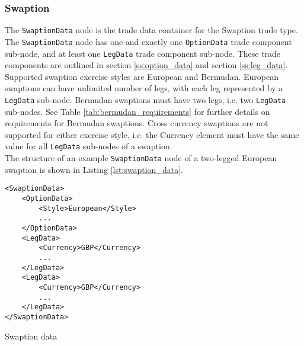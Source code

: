 \subsubsection{Swaption}

The \lstinline!SwaptionData!  node is the trade data container for the Swaption trade type. The \lstinline!SwaptionData!
node has one and exactly one \lstinline!OptionData! trade component sub-node, and at least one \lstinline!LegData! trade
component sub-node.  These trade components are outlined in section \ref{ss:option_data} and section
\ref{ss:leg_data}.\\

Supported swaption exercise styles are European and Bermudan. European swaptions can have unlimited number of legs, with
each leg represented by a \lstinline!LegData! sub-node. Bermudan swaptions must have two legs, i.e. two
\lstinline!LegData! sub-nodes. See Table \ref{tab:bermudan_requirements} for further details on requirements for
Bermudan swaptions. Cross currency swaptions are not supported for either exercise style, i.e. the Currency element must
have the same value for all \lstinline!LegData! sub-nodes of a swaption.\\

The structure of an example \lstinline!SwaptionData!  node of a two-legged European swaption is shown in Listing
\ref{lst:swaption_data}.

\begin{listing}[H]
\begin{verbatim}
<SwaptionData>
    <OptionData>
        <Style>European</Style>
        ...
    </OptionData>
    <LegData>
        <Currency>GBP</Currency>
        ...
    </LegData>
    <LegData>
        <Currency>GBP</Currency>
        ...
    </LegData>
</SwaptionData>
\end{verbatim}
\caption{Swaption data}
\label{lst:swaption_data}
\end{listing}

